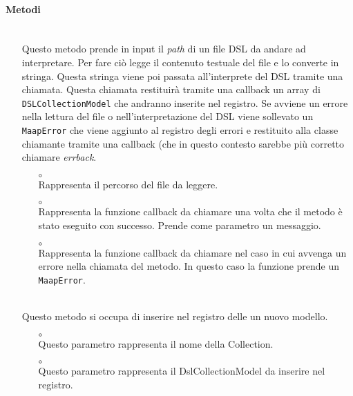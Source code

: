 \paragraph*{Metodi}
\begin{itemize}
\item[]  \\ Questo metodo prende in input il \textit{path} di un file DSL da andare ad interpretare. Per fare ciò legge il contenuto testuale del file e lo converte in stringa. Questa stringa viene poi passata all'interprete del DSL tramite una chiamata. Questa chiamata restituirà tramite una callback un array di \texttt{DSLCollectionModel} che andranno inserite nel registro. Se avviene un errore nella lettura del file o nell'interpretazione del DSL viene sollevato un \texttt{MaapError} che viene aggiunto al registro degli errori e restituito alla classe chiamante tramite una callback (che in questo contesto sarebbe più corretto chiamare \textit{errback}.
\begin{itemize}\addtolength{\itemsep}{-0.5\baselineskip}
\item[$\circ$]  \\ Rappresenta il percorso del file da leggere.
\item[$\circ$]  \\ Rappresenta la funzione callback da chiamare una volta che il metodo è stato eseguito con successo. Prende come parametro un messaggio.
\item[$\circ$]  \\ Rappresenta la funzione callback da chiamare nel caso in cui avvenga un errore nella chiamata del metodo. In questo caso la funzione prende un \texttt{MaapError}.
\end{itemize}
\item[]  \\ Questo metodo si occupa di inserire nel registro delle  un nuovo modello.
\begin{itemize}\addtolength{\itemsep}{-0.5\baselineskip}
\item[$\circ$]  \\ Questo parametro rappresenta il nome della Collection.
\item[$\circ$]  \\ Questo parametro rappresenta il DslCollectionModel da inserire nel registro.

\end{itemize}
\end{itemize}

